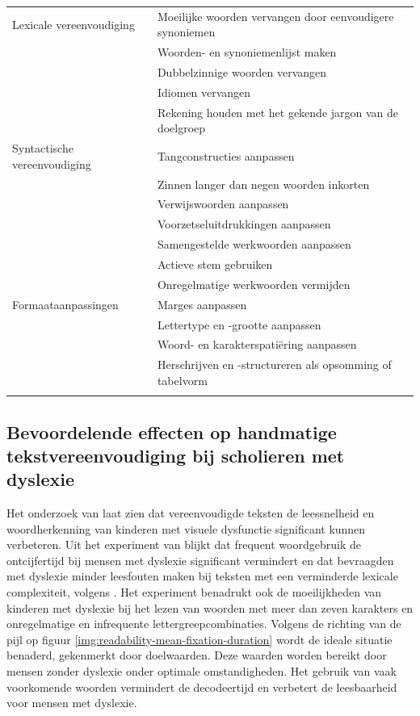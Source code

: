 \begin{center}
	\begin{tabular}{ | m{4cm} | m{12cm} | } 
		\hline
		Lexicale vereenvoudiging & Moeilijke woorden vervangen door eenvoudigere synoniemen \\ 
			& Woorden- en synoniemenlijst maken \\
			& Dubbelzinnige woorden vervangen \\
			& Idiomen vervangen \\ 
			& Rekening houden met het gekende jargon van de doelgroep \\
		\hline
		Syntactische vereenvoudiging & Tangconstructies aanpassen \\
		& Zinnen langer dan negen woorden inkorten \\
		& Verwijswoorden aanpassen \\
		& Voorzetseluitdrukkingen aanpassen \\
		& Samengestelde werkwoorden aanpassen \\
		& Actieve stem gebruiken \\
		& Onregelmatige werkwoorden vermijden \\
		\hline
		Formaataanpassingen & Marges aanpassen \\
		& Lettertype en -grootte aanpassen \\
		& Woord- en karakterspatiëring aanpassen \\
		& Herschrijven en -structureren als opsomming of tabelvorm \\
		& \\
		\hline
	\end{tabular}
	\label{table:manual-simplification}
\end{center}

\subsection{Bevoordelende effecten op handmatige tekstvereenvoudiging bij scholieren met dyslexie}

Het onderzoek van \textcite{RiveroContreras2021} laat zien dat vereenvoudigde teksten de leessnelheid en woordherkenning van kinderen met visuele dysfunctie significant kunnen verbeteren. Uit het experiment van \textcite{Rello2013a} blijkt dat frequent woordgebruik de ontcijfertijd bij mensen met dyslexie significant vermindert en dat bevraagden met dyslexie minder leesfouten maken bij teksten met een verminderde lexicale complexiteit, volgens \textcite{Gala2016}. Het experiment benadrukt ook de moeilijkheden van kinderen met dyslexie bij het lezen van woorden met meer dan zeven karakters en onregelmatige en infrequente lettergreepcombinaties. Volgens de richting van de pijl op figuur  \ref{img:readability-mean-fixation-duration} wordt de ideale situatie benaderd, gekenmerkt door doelwaarden. Deze waarden worden bereikt door mensen zonder dyslexie onder optimale omstandigheden. Het gebruik van vaak voorkomende woorden vermindert de decodeertijd en verbetert de leesbaarheid voor mensen met dyslexie.

